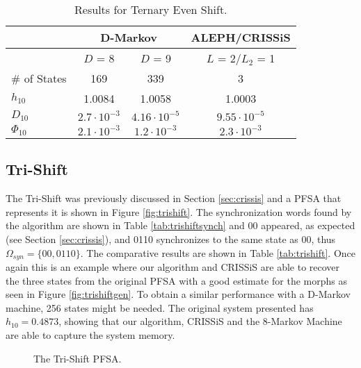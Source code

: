 {\begin{table}
\centering
\caption{Results for Ternary Even Shift. \label{tab:ternaryeven}}
\begin{tabular}{|l|c|c|c|}
\hline
 & \multicolumn{2}{c|}{D-Markov} & ALEPH/CRISSiS\\
 \hline
 & $D$ = 8 & $D$ = 9 &  $L$ = 2/$L_2$ = 1 \\
\hline
\# of States & 169 & 339 & 3 \\ 
$h_{10}$ & 1.0084 & 1.0058 & 1.0003 \\
$D_{10}$ & $2.7\cdot10^{-3}$ & $4.16\cdot10^{-5}$ & $9.55\cdot10^{-5}$ \\
$\Phi_{10}$  & $2.1\cdot10^{-3}$ & $1.2\cdot10^{-3}$ & $2.3\cdot10^{-3}$ \\
 \hline
\end{tabular}
\end{table}

\subsection{Tri-Shift}

The Tri-Shift was previously discussed in Section \ref{sec:crissis} and a PFSA that represents it is shown in Figure \ref{fig:trishift}. The synchronization words found by the algorithm are shown in Table \ref{tab:trishiftsynch} and 00 appeared, as expected (see Section \ref{sec:crissis}), and 0110 synchronizes to the same state as 00, thus $\Omega_{syn} = \{00, 0110\}$. The comparative results are shown in Table \ref{tab:trishift}. Once again this is an example where our algorithm and CRISSiS are able to recover the three states from the original PFSA with a good estimate for the morphs as seen in Figure \ref{fig:trishiftgen}. To obtain a similar performance with a D-Markov machine, 256 states might be needed. The original system presented has $h_{10} = 0.4873$, showing that our algorithm, CRISSiS and the 8-Markov Machine are able to capture the system memory.

\begin{figure}
\centering
{}
\caption{The Tri-Shift PFSA.\label{fig:trishift_again}}
\end{figure}

}
